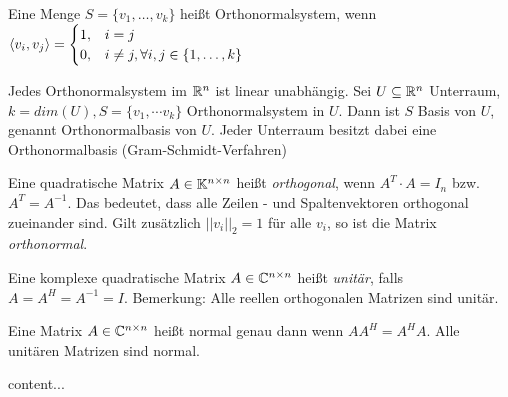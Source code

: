 \begin{definition}[Orthonormalsystem]
	Eine Menge $S = \{ v_1, \dots, v_k \} $ heißt Orthonormalsystem, wenn $\langle v_i, v_j \rangle = \begin{cases}
		1, & i = j \\
		0, & i \neq j, \forall i,j \in \{1, \dots, k\}
	\end{cases}$
\end{definition}

\begin{satz}
	Jedes Orthonormalsystem im $\mathbb{R}^n$ ist linear unabhängig. 
	Sei $U \subseteq \mathbb{R}^n$ Unterraum, $k = dim(U), S = \{v_1,\dotsm v_k\}$ Orthonormalsystem in $U$. Dann ist $S$ Basis von $U$, genannt Orthonormalbasis von $U$. Jeder Unterraum besitzt dabei eine Orthonormalbasis (Gram-Schmidt-Verfahren)
\end{satz}

\begin{definition}
	Eine quadratische Matrix $A \in \mathbb{K}^{n \times n}$ heißt \emph{orthogonal}, wenn $A^T \cdot A = I_n$ bzw. $A^T = A^{-1}$. Das bedeutet, dass alle Zeilen - und Spaltenvektoren orthogonal zueinander sind. Gilt zusätzlich $||v_i||_2 = 1$ für alle $v_i$, so ist die Matrix \emph{orthonormal}.
\end{definition}


\begin{definition}
	Eine komplexe quadratische Matrix $A \in \mathbb{C}^{n \times n}$ heißt \emph{unitär}, falls $A = A^H = A^{-1} = I$. Bemerkung: Alle reellen orthogonalen Matrizen sind unitär.
\end{definition}

\begin{definition}
	Eine Matrix $A \in \mathbb{C}^{n \times n}$ heißt normal genau dann wenn $AA^H = A^HA$. Alle unitären Matrizen sind normal.
\end{definition}

\begin{satz}
	content...
\end{satz}

\pagebreak



